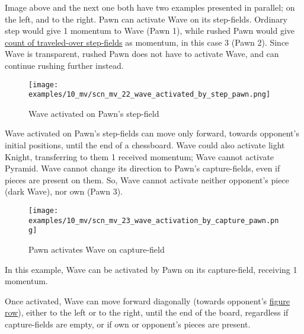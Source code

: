 \vspace*{-0.5\baselineskip}
Image above and the next one both have two examples presented in parallel; on the
left, and to the right. \newline
\indent
Pawn can activate Wave on its step-fields. Ordinary step would give 1 momentum to
Wave (Pawn 1), while rushed Pawn would give
\hyperref[sec:Mayan Ascendancy/Pyramid/Momentum/Fields counting]{count of traveled-over step-fields}
as momentum, in this case 3 (Pawn 2). Since Wave is transparent, rushed Pawn does
not have to activate Wave, and can continue rushing further instead.

\clearpage %

\vspace*{-2.1\baselineskip}
\noindent
\begin{figure}[!h]
\texttt{[image: examples/10\_mv/scn\_mv\_22\_wave\_activated\_by\_step\_pawn.png]}
\caption{Wave activated on Pawn's step-field}
\label{fig:scn_mv_22_wave_activated_by_step_pawn}
\end{figure}

Wave activated on Pawn's step-fields can move only forward, towards opponent's
initial positions, until the end of a chessboard. Wave could also activate light
Knight, transferring to them 1 received momentum; Wave cannot activate Pyramid.
Wave cannot change its direction to Pawn's capture-fields, even if pieces are
present on them. So, Wave cannot activate neither opponent's piece (dark Wave),
nor own (Pawn 3).

\clearpage %

\vspace*{-2.1\baselineskip}
\noindent
\begin{figure}[!h]
\texttt{[image: examples/10\_mv/scn\_mv\_23\_wave\_activation\_by\_capture\_pawn.png]}
\caption{Pawn activates Wave on capture-field}
\label{fig:scn_mv_23_wave_activation_by_capture_pawn}
\end{figure}

In this example, Wave can be activated by Pawn on its capture-field, receiving 1 momentum.

Once activated, Wave can move forward diagonally (towards opponent's
\hyperref[sec:Terms/Figure row]{figure row}), either to the left or to the right, until the
end of the board, regardless if capture-fields are empty, or if own or opponent's pieces are
present.

